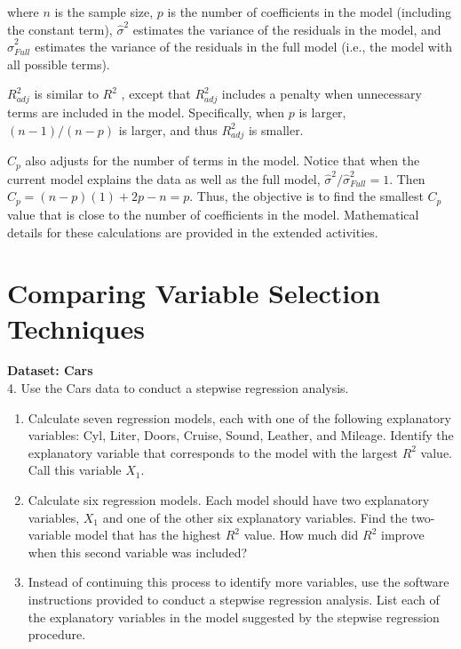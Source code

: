 \documentclass[
]{report}
\begin{document}
where \(n\) is the sample size, \(p\) is the number of coefficients in the model (including the constant term), \(\hat{\sigma}^2\) estimates the variance of the residuals in the model, and \(\hat{\sigma}^2_{Full}\) estimates the variance of the residuals in the full model (i.e., the model with all possible terms).

\(R^2_{adj}\) is similar to \(R^2\) , except that \(R^2_{adj}\) includes a penalty when unnecessary terms are included in the model. Specifically, when \(p\) is larger, \((n - 1)/(n - p)\) is larger, and thus \(R^2_{adj}\) is smaller.

\(C_p\) also adjusts for the number of terms in the model. Notice that when the current model explains the data as well as the full model, \(\hat{\sigma}^2 / \hat{\sigma}^2_{Full} = 1\). Then \(C_p = (n - p)(1) + 2p - n = p\). Thus, the objective is to find the smallest
\(C_p\) value that is close to the number of coefficients in the model. Mathematical details for these calculations are provided in the extended activities.

\hypertarget{comparing-variable-selection-techniques}{%
\section*{Comparing Variable Selection Techniques}\label{comparing-variable-selection-techniques}}

\textbf{Dataset: Cars}\\
4. Use the Cars data to conduct a stepwise regression analysis.

\begin{enumerate}
\def\labelenumi{\alph{enumi}.}
\item
  Calculate seven regression models, each with one of the following explanatory variables: Cyl, Liter, Doors, Cruise, Sound, Leather, and Mileage. Identify the explanatory variable that corresponds to the model with the largest \(R^2\) value. Call this variable \(X_1\).
\item
  Calculate six regression models. Each model should have two explanatory variables, \(X_1\) and one of the other six explanatory variables. Find the two-variable model that has the highest \(R^2\) value. How much did \(R^2\) improve when this second variable was included?
\item
  Instead of continuing this process to identify more variables, use the software instructions provided to conduct a stepwise regression analysis. List each of the explanatory variables in the model suggested by the stepwise regression procedure.
\end{enumerate}
\end{document}
